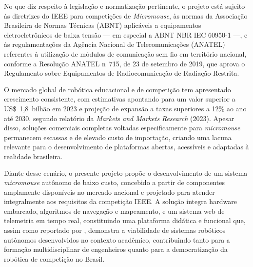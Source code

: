 No que diz respeito à legislação e normatização pertinente, o projeto está sujeito
às diretrizes do IEEE para competições de \textit{Micromouse}, às normas da
Associação Brasileira de Normas Técnicas (ABNT) aplicáveis a equipamentos
eletroeletrônicos de baixa tensão --- em especial a ABNT NBR IEC 60950-1 ---,
e às regulamentações da Agência Nacional de Telecomunicações (ANATEL) referentes
à utilização de módulos de comunicação sem fio em território nacional, conforme a
Resolução ANATEL n\textordmasculine{}~715, de 23 de setembro de 2019, que aprova
o Regulamento sobre Equipamentos de Radiocomunicação de Radiação Restrita.

O mercado global de robótica educacional e de competição tem apresentado crescimento
consistente, com estimativas apontando para um valor superior a US\$~1,8~bilhão em
2023 e projeção de expansão a taxas superiores a 12\% ao ano até 2030, segundo
relatório da \textit{Markets and Markets Research} (2023).
Apesar disso, soluções comerciais completas voltadas especificamente para
\textit{micromouse} permanecem escassas e de elevado custo de importação, criando
uma lacuna relevante para o desenvolvimento de plataformas abertas, acessíveis e
adaptadas à realidade brasileira.

Diante desse cenário, o presente projeto propõe o desenvolvimento de um sistema
\textit{micromouse} autônomo de baixo custo, concebido a partir de componentes
amplamente disponíveis no mercado nacional e projetado para atender integralmente
aos requisitos da competição IEEE.
A solução integra hardware embarcado, algoritmos de navegação e mapeamento, e um
sistema web de telemetria em tempo real, constituindo uma plataforma didática e
funcional que, assim como reportado por \cite{387215}, demonstra a viabilidade de
sistemas robóticos autônomos desenvolvidos no contexto acadêmico, contribuindo
tanto para a formação multidisciplinar de engenheiros quanto para a democratização
da robótica de competição no Brasil.
